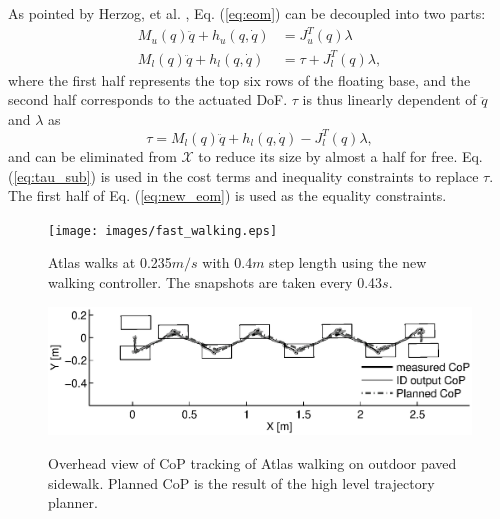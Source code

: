 \documentclass{ws-ijhr}
\newcommand{\eref}[1] {Eq. (\ref{#1})}
\newcommand{\QPx}{\mathcal{X}}
\begin{document}
As pointed by Herzog, et al. \cite{alex_hir}, \eref{eq:eom} can be decoupled 
into two parts:
\begin{equation}
	\begin{split}
		M_u(q) \ddot{q} + h_u(q,\dot{q}) &= J^T_u(q) \lambda \\
		M_l(q) \ddot{q} + h_l(q,\dot{q}) &= \tau + J^T_l(q) \lambda,
	\end{split}
\label{eq:new_eom}
\end{equation} 
where the first half represents the top six rows of the floating base, 
and the second half corresponds to the actuated DoF. 
$\tau$ is thus linearly dependent of $\ddot{q}$ and $\lambda$ as
\begin{equation}
	\tau = M_l(q) \ddot{q} + h_l(q,\dot{q}) - J^T_l(q) \lambda,
\label{eq:tau_sub}
\end{equation} 
and can be eliminated from $\QPx$ to reduce its size by almost a half for free. 
\eref{eq:tau_sub} is used in the cost terms and inequality constraints to 
replace $\tau$. 
The first half of \eref{eq:new_eom} is used as the equality constraints.

\begin{figure} 
  \begin{center}
    {\texttt{[image: images/fast\_walking.eps]}}
    \caption{Atlas walks at 0.235$m/s$ with 0.4$m$ step length using the
		new walking controller. The snapshots are taken every 0.43$s$.} 
		\label{fig:fast_walking}
  \end{center}
\end{figure}   

\begin{figure} 
  \begin{center}
    {\includegraphics[width=1\textwidth]{images/new_cop.eps}}
    \caption{Overhead view of CoP tracking of Atlas walking on outdoor paved 
		sidewalk. 
		Planned CoP is the result of the high level trajectory planner. } 
		\label{fig:long_walk_cop}
  \end{center}
\end{figure}   
 
 
\end{document}
